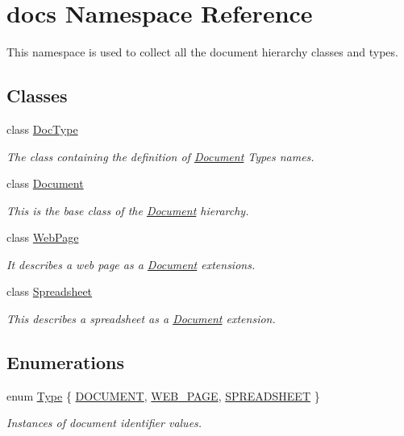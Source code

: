 \hypertarget{namespacedocs}{\section{docs Namespace Reference}
\label{namespacedocs}
}


This namespace is used to collect all the document hierarchy classes and types.  


\subsection*{Classes}
\begin{DoxyCompactItemize}
\item 
class \hyperlink{classdocs_1_1DocType}{Doc\-Type}
\begin{DoxyCompactList}\small\item\em The class containing the definition of \hyperlink{classdocs_1_1Document}{Document} Types names. \end{DoxyCompactList}\item 
class \hyperlink{classdocs_1_1Document}{Document}
\begin{DoxyCompactList}\small\item\em This is the base class of the \hyperlink{classdocs_1_1Document}{Document} hierarchy. \end{DoxyCompactList}\item 
class \hyperlink{classdocs_1_1WebPage}{Web\-Page}
\begin{DoxyCompactList}\small\item\em It describes a web page as a \hyperlink{classdocs_1_1Document}{Document} extensions. \end{DoxyCompactList}\item 
class \hyperlink{classdocs_1_1Spreadsheet}{Spreadsheet}
\begin{DoxyCompactList}\small\item\em This describes a spreadsheet as a \hyperlink{classdocs_1_1Document}{Document} extension. \end{DoxyCompactList}\end{DoxyCompactItemize}
\subsection*{Enumerations}
\begin{DoxyCompactItemize}
\item 
enum \hyperlink{namespacedocs_a150efca62822b8ab62a5afabe299bf75}{Type} \{ \hyperlink{namespacedocs_a150efca62822b8ab62a5afabe299bf75ab5b85a2de45c75c8eb58ccb377a01543}{D\-O\-C\-U\-M\-E\-N\-T}, 
\hyperlink{namespacedocs_a150efca62822b8ab62a5afabe299bf75a1660685efab992a33bb802d68b4e8c13}{W\-E\-B\-\_\-\-P\-A\-G\-E}, 
\hyperlink{namespacedocs_a150efca62822b8ab62a5afabe299bf75a7c469773c8012b650a4db4d9f46e343a}{S\-P\-R\-E\-A\-D\-S\-H\-E\-E\-T}
 \}
\begin{DoxyCompactList}\small\item\em Instances of document identifier values. \end{DoxyCompactList}\end{DoxyCompactItemize}
